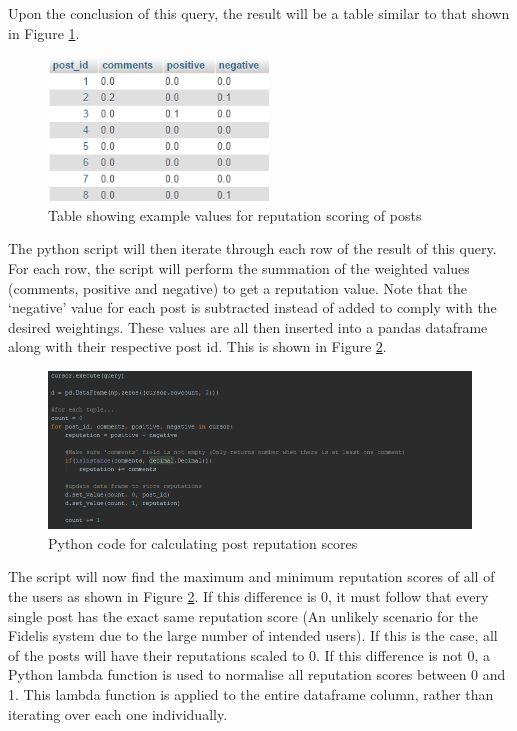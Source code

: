 Upon the conclusion of this query, the result will be a table similar to that shown in Figure \ref{fig:PostRepTable}.

\begin{figure}[H]
\centering
\includegraphics[height=1.5in]{Images/Implementation/PostRepTable}
\caption{Table showing example values for reputation scoring of posts}
\label{fig:PostRepTable}
\end{figure}

The python script will then iterate through each row of the result of this query. For each row, the script will perform the summation of the weighted values (comments, positive and negative) to get a reputation value. Note that the `negative' value for each post is subtracted instead of added to comply with the desired weightings. These values are all then inserted into a pandas dataframe \cite{Pandas} along with their respective post id. This is shown in Figure \ref{fig:PostRepPython1}.

\begin{figure}[H]
\centering
\includegraphics[width=\linewidth]{Images/Implementation/PostRepPython1}
\caption{Python code for calculating post reputation scores}
\label{fig:PostRepPython1}
\end{figure}

The script will now find the maximum and minimum reputation scores of all of the users as shown in Figure \ref{fig:PostRepPython1}. If this difference is 0, it must follow that every single post has the exact same reputation score (An unlikely scenario for the Fidelis system due to the large number of intended users). If this is the case, all of the posts will have their reputations scaled to 0. If this difference is not 0, a Python lambda function is used to normalise all reputation scores between 0 and 1. This lambda function is applied to the entire dataframe column, rather than iterating over each one individually.

